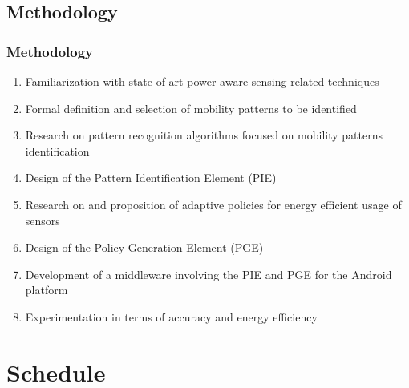 \documentclass[compress,9pt,xcolor={dvipsnames,table}]{beamer}
\begin{document}
\subsection{Methodology}
\begin{frame}\frametitle{Methodology}
\begin{enumerate}
  \item Familiarization with state-of-art power-aware sensing related techniques
  \item Formal definition and selection of mobility patterns to be identified
  \item Research on pattern recognition algorithms focused on mobility patterns identification
  \item Design of the Pattern Identification Element (PIE)
  \item Research on and proposition of adaptive policies for energy efficient usage of sensors
  \item Design of the Policy Generation Element (PGE)
  \item Development of a middleware involving the PIE and PGE for the Android platform
  \item Experimentation in terms of accuracy and energy efficiency
\end{enumerate}
\end{frame}


\section{Schedule}
\end{document}
